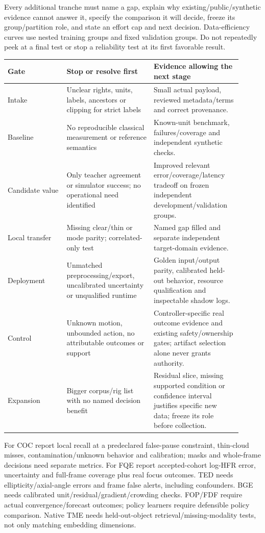 \documentclass[11pt,a4paper]{article}
\begin{document}
Every additional tranche must name a gap, explain why existing/public/synthetic
evidence cannot answer it, specify the comparison it will decide, freeze its
group/partition role, and state an effort cap and next decision. Data-efficiency
curves use nested training groups and fixed validation groups. Do not repeatedly
peek at a final test or stop a reliability test at its first favorable result.

\begin{longtable}{@{}L{0.23\linewidth}L{0.34\linewidth}L{0.34\linewidth}@{}}
\toprule Gate & Stop or resolve first & Evidence allowing the next stage\\\midrule\endhead
Intake & Unclear rights, units, labels, ancestors or clipping for strict labels &
Small actual payload, reviewed metadata/terms and correct provenance.\\
Baseline & No reproducible classical measurement or reference semantics &
Known-unit benchmark, failures/coverage and independent synthetic checks.\\
Candidate value & Only teacher agreement or simulator success; no operational
need identified & Improved relevant error/coverage/latency tradeoff on frozen
independent development/validation groups.\\
Local transfer & Missing clear/thin or mode parity; correlated-only test &
Named gap filled and separate independent target-domain evidence.\\
Deployment & Unmatched preprocessing/export, uncalibrated uncertainty or
unqualified runtime & Golden input/output parity, calibrated held-out behavior,
resource qualification and inspectable shadow logs.\\
Control & Unknown motion, unbounded action, no attributable outcomes or support &
Controller-specific real outcome evidence and existing safety/ownership gates;
artifact selection alone never grants authority.\\
Expansion & Bigger corpus/rig list with no named decision benefit &
Residual slice, missing supported condition or confidence interval justifies
specific new data; freeze its role before collection.\\
\bottomrule
\end{longtable}

For COC report local recall at a predeclared false-pause constraint, thin-cloud
misses, contamination/unknown behavior and calibration; masks and whole-frame
decisions need separate metrics. For FQE report accepted-cohort log-HFR error,
uncertainty and full-frame coverage plus real focus outcomes. TED needs
ellipticity/axial-angle errors and frame false alerts, including confounders.
BGE needs calibrated unit/residual/gradient/crowding checks. FOP/FDF require
actual convergence/forecast outcomes; policy learners require defensible policy
comparison. Native TME needs held-out-object retrieval/missing-modality tests,
not only matching embedding dimensions.
\end{document}
